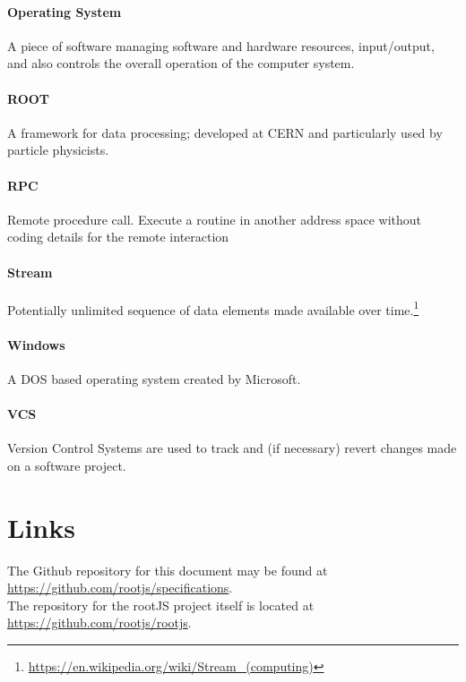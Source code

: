 
\paragraph{Operating System}
A piece of software managing software and hardware resources, input/output, and also controls the overall operation of the computer system.


\paragraph{ROOT}
A framework for data processing; developed at CERN and particularly used by particle physicists.

\paragraph{RPC}
Remote procedure call. Execute a routine in another address space without coding details for the remote interaction

\paragraph{Stream}
Potentially unlimited sequence of data elements made available over time.\footnote{\url{https://en.wikipedia.org/wiki/Stream_(computing)}}


\paragraph{Windows}
A DOS based operating system created by Microsoft.

\paragraph{VCS}
Version Control Systems are used to track and (if necessary) revert changes made on a software project.

\pagebreak[4]

\section{Links}

The Github repository for this document may be found at \url{https://github.com/rootjs/specifications}. \\
The repository for the rootJS project itself is located at \url{https://github.com/rootjs/rootjs}.
